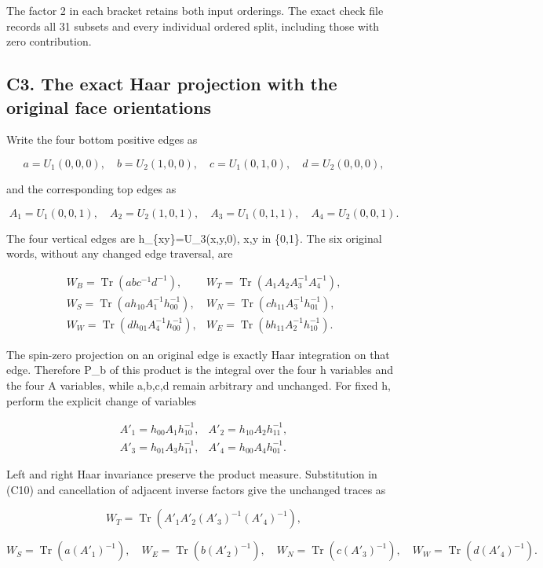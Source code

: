 \documentclass[11pt]{article}
\begin{document}
The factor 2 in each bracket retains both input orderings. The exact check file records all 31 subsets and every individual ordered split, including those with zero contribution.

\subsection*{C3. The exact Haar projection with the original face orientations}

Write the four bottom positive edges as

\[
 a=U_1(0,0,0),\quad b=U_2(1,0,0),\quad
 c=U_1(0,1,0),\quad d=U_2(0,0,0),
\]

and the corresponding top edges as

\[
 A_1=U_1(0,0,1),\quad A_2=U_2(1,0,1),\quad
 A_3=U_1(0,1,1),\quad A_4=U_2(0,0,1).
\]

The four vertical edges are h\_\{xy\}=U\_3(x,y,0), x,y in \{0,1\}. The six original words, without any changed edge traversal, are

\[
\begin{array}{ll}
 W_B=\operatorname{Tr}(abc^{-1}d^{-1}),&
 W_T=\operatorname{Tr}(A_1A_2A_3^{-1}A_4^{-1}),\\
 W_S=\operatorname{Tr}(ah_{10}A_1^{-1}h_{00}^{-1}),&
 W_N=\operatorname{Tr}(ch_{11}A_3^{-1}h_{01}^{-1}),\\
 W_W=\operatorname{Tr}(dh_{01}A_4^{-1}h_{00}^{-1}),&
 W_E=\operatorname{Tr}(bh_{11}A_2^{-1}h_{10}^{-1}).
\end{array} \tag{C10}
\]

The spin-zero projection on an original edge is exactly Haar integration on that edge. Therefore P\_b of this product is the integral over the four h variables and the four A variables, while a,b,c,d remain arbitrary and unchanged. For fixed h, perform the explicit change of variables

\[
\begin{array}{ll}
 A'_1=h_{00}A_1h_{10}^{-1},& A'_2=h_{10}A_2h_{11}^{-1},\\
 A'_3=h_{01}A_3h_{11}^{-1},& A'_4=h_{00}A_4h_{01}^{-1}.
\end{array} \tag{C11}
\]

Left and right Haar invariance preserve the product measure. Substitution in (C10) and cancellation of adjacent inverse factors give the unchanged traces as

\[
 W_T=\operatorname{Tr}(A'_1A'_2(A'_3)^{-1}(A'_4)^{-1}),
\]

\[
 W_S=\operatorname{Tr}(a(A'_1)^{-1}),\quad
 W_E=\operatorname{Tr}(b(A'_2)^{-1}),\quad
 W_N=\operatorname{Tr}(c(A'_3)^{-1}),\quad
 W_W=\operatorname{Tr}(d(A'_4)^{-1}). \tag{C12}
\]
\end{document}
